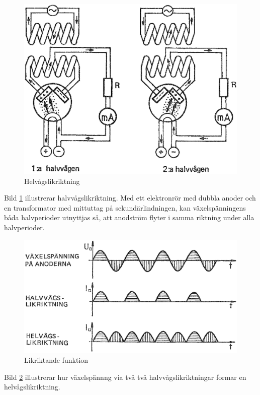 \begin{figure}
\includegraphics[width=\textwidth]{images/cropped_pdfs/bild_2_2-28.pdf}
\caption{Helvågslikriktning}
\label{fig:BildII2-28}
\end{figure}

Bild \ref{fig:BildII2-28} illustrerar halvvågslikriktning.
Med ett elektronrör med dubbla anoder och en transformator med mittuttag på
sekundärlindningen, kan växelspänningens båda halvperioder utnyttjas så, att
anodström flyter i samma riktning under alla halvperioder.

\begin{figure}
\includegraphics[width=\textwidth]{images/cropped_pdfs/bild_2_2-29.pdf}
\caption{Likriktande funktion}
\label{fig:BildII2-29}
\end{figure}

Bild \ref{fig:BildII2-29} illustrerar hur växelspännng via två
två halvvågslikriktningar formar en helvågslikriktning.

